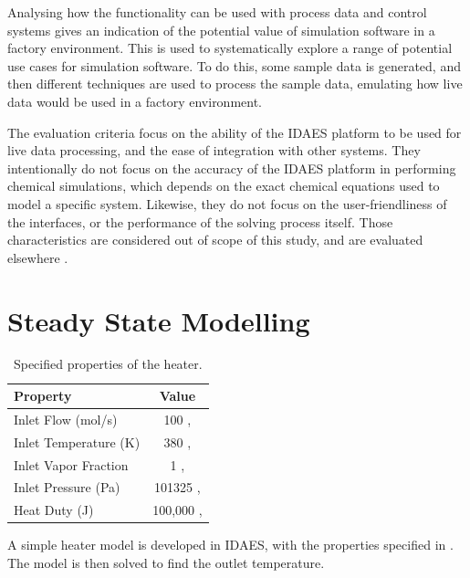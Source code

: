 \documentclass[12pt]{article}
\begin{document}
Analysing how the functionality can be used with process data and control systems gives an indication of the potential value of simulation software in a factory environment. This is used to systematically explore a range of potential use cases for simulation software. 
To do this, some sample data is generated, and then different techniques are used to process the sample data, emulating how live data would be used in a factory environment.

The evaluation criteria focus on the ability of the IDAES platform to be used for live data processing, and the ease of integration with other systems.
They intentionally do not focus on the accuracy of the IDAES platform in performing chemical simulations, which depends on the exact chemical equations used to model a specific system. 
Likewise, they do not focus on the user-friendliness of the interfaces, or the performance of the solving process itself. Those characteristics are considered out of scope of this study, and are evaluated elsewhere \cite{hart2011pyomo} \cite{myhre2022investigation}.








\section{Steady State Modelling} \label{sec:steady_state}

\begin{table}[h]
    \centering
    \begin{tabular}{|l|c|}
        \hline
        \textbf{Property} & \textbf{Value} \\
        \hline
        Inlet Flow (mol/s) & 100 , \\
        \hline
        Inlet Temperature (K) & 380 , \\
        \hline
        Inlet Vapor Fraction & 1 ,  \\
        \hline
        Inlet Pressure (Pa) & 101325 ,  \\
        \hline
        Heat Duty (J) & 100,000 , \\
        \hline
    \end{tabular}
    \caption{Specified properties of the heater.}
    \label{tab:heater_properties}
\end{table}

A simple heater model is developed in IDAES, with the properties specified in . The model is then solved to find the outlet temperature.
\end{document}
